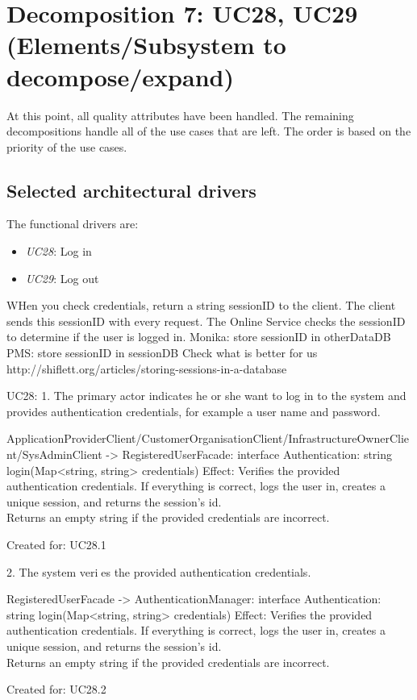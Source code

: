 \section{Decomposition 7: UC28, UC29 (Elements/Subsystem to decompose/expand)}
    At this point, all quality attributes have been handled. The remaining
    decompositions handle all of the use cases that are left. The order
    is based on the priority of the use cases.


\subsection{Selected architectural drivers}
    The functional drivers are:
    \begin{itemize}
        \item \emph{UC28}: Log in
        \item \emph{UC29}: Log out
    \end{itemize}

    WHen you check credentials, return a string sessionID to the client.
    The client sends this sessionID with every request.
    The Online Service checks the sessionID to determine if the user is logged in.
    Monika: store sessionID in otherDataDB
    PMS: store sessionID in sessionDB
    Check what is better for us
    http://shiflett.org/articles/storing-sessions-in-a-database

    UC28:
        1. The primary actor indicates he or she want to log in to the system and provides authentication credentials, for example a user name and password.

            ApplicationProviderClient/CustomerOrganisationClient/InfrastructureOwnerClient/SysAdminClient -> RegisteredUserFacade: interface Authentication: string login(Map<string, string> credentials)
                Effect: Verifies the provided authentication credentials. If everything is correct, logs the user in, creates a unique session, and returns the session's id. \\
                        Returns an empty string if the provided credentials are incorrect.
                \item Created for: UC28.1

        2. The system veries the provided authentication credentials.

            RegisteredUserFacade -> AuthenticationManager: interface Authentication: string login(Map<string, string> credentials)
                Effect: Verifies the provided authentication credentials. If everything is correct, logs the user in, creates a unique session, and returns the session's id. \\
                        Returns an empty string if the provided credentials are incorrect.
                \item Created for: UC28.2

